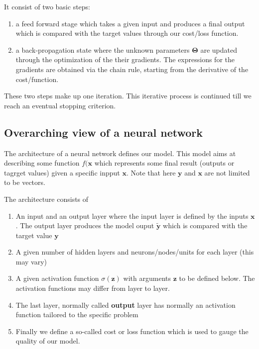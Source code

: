 \documentclass[%
oneside,                 %
final,                   %
10pt]{article}
\begin{document}
It consist of two basic steps:
\begin{enumerate}
\item a feed forward stage which takes a given input and produces a final output which is compared with the target values through our cost/loss function.

\item a back-propagation state where the unknown parameters $\bm{\Theta}$ are updated through the optimization of the their gradients. The expressions for the gradients are obtained via the chain rule, starting from the derivative of the cost/function.
\end{enumerate}

\noindent
These two steps make up one iteration. This iterative process is continued till we reach an eventual stopping criterion.

\subsection{Overarching view of a neural network}

The architecture of a neural network defines our model. This model
aims at describing some function $f(\bm{x}$ which represents
some final result (outputs or tagrget values) given a specific inpput
$\bm{x}$. Note that here $\bm{y}$ and $\bm{x}$ are not limited to be
vectors.

The architecture consists of
\begin{enumerate}
\item An input and an output layer where the input layer is defined by the inputs $\bm{x}$. The output layer produces the model ouput $\bm{\tilde{y}}$ which is compared with the target value $\bm{y}$

\item A given number of hidden layers and neurons/nodes/units for each layer (this may vary)

\item A given activation function $\sigma(\bm{z})$ with arguments $\bm{z}$ to be defined below. The activation functions may differ from layer to layer.

\item The last layer, normally called \textbf{output} layer has normally an activation function tailored to the specific problem

\item Finally we define a so-called cost or loss function which is used to gauge the quality of our model. 
\end{enumerate}
\end{document}
